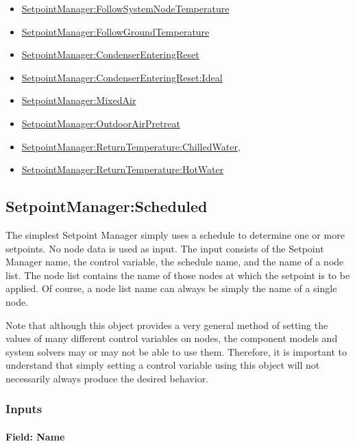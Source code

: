 \begin{itemize}
\item
  \hyperref[setpointmanagerfollowsystemnodetemperature]{SetpointManager:FollowSystemNodeTemperature}
\item
  \hyperref[setpointmanagerfollowgroundtemperature]{SetpointManager:FollowGroundTemperature}
\item
  \hyperref[setpointmanagercondenserenteringreset]{SetpointManager:CondenserEnteringReset}
\item
  \hyperref[setpointmanagercondenserenteringresetideal]{SetpointManager:CondenserEnteringReset:Ideal}
\item
  \hyperref[setpointmanagermixedair]{SetpointManager:MixedAir}
\item
  \hyperref[setpointmanageroutdoorairpretreat]{SetpointManager:OutdoorAirPretreat}
\item
  \hyperref[setpointmanagerreturntemperaturechilledwater]{SetpointManager:ReturnTemperature:ChilledWater},
\item
  \hyperref[setpointmanagerreturntemperaturehotwater]{SetpointManager:ReturnTemperature:HotWater}
\end{itemize}

\subsection{SetpointManager:Scheduled}\label{setpointmanagerscheduled}

The simplest Setpoint Manager simply uses a schedule to determine one or more setpoints. No node data is used as input. The input consists of the Setpoint Manager name, the control variable, the schedule name, and the name of a node list. The node list contains the name of those nodes at which the setpoint is to be applied. Of course, a node list name can always be simply the name of a single node.

Note that although this object provides a very general method of setting the values of many different control variables on nodes, the component models and system solvers may or may not be able to use them. Therefore, it is important to understand that simply setting a control variable using this object will not necessarily always produce the desired behavior.

\subsubsection{Inputs}\label{inputs-043}

\paragraph{Field: Name}\label{field-name-042}

